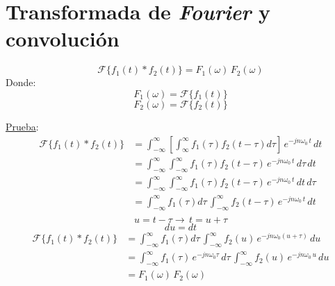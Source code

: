 \section{Transformada de \emph{Fourier} y convolución}
\begin{equation}
    \mathcal{F}\{f_1(t)*f_2(t)\}=F_1(\omega)\,F_2(\omega)
\end{equation}
Donde:
\begin{equation*}
    F_1(\omega)=\mathcal{F}\{f_1(t)\}
\end{equation*}
\begin{equation*}
    F_2(\omega)=\mathcal{F}\{f_2(t)\}
\end{equation*}

\underline{Prueba}:
\begin{equation*}
\begin{split}
    \mathcal{F}\{f_1(t)*f_2(t)\}
        &=\int_{-\infty}^{\infty}\left[
            \int_{\infty}^{\infty}f_1(\tau)f_2(t-\tau)d\tau
        \right]\,e^{-jn\omega_0\,t}\,dt\\
        &=\int_{-\infty}^{\infty}\int_{-\infty}^{\infty}
            f_1(\tau)f_2(t-\tau)\,e^{-jn\omega_0\,t}\,d\tau\,dt\\
        &=\int_{-\infty}^{\infty}\int_{-\infty}^{\infty}
            f_1(\tau)f_2(t-\tau)\,e^{-jn\omega_0\,t}\,dt\,d\tau\\
        &=\int_{-\infty}^{\infty}f_1(\tau)d\tau\,\int_{-\infty}^{\infty}
            f_2(t-\tau)\,e^{-jn\omega_0\,t}\,dt\\
\end{split}
\end{equation*}
\begin{equation*}
    u=t-\tau\rightarrow\,t=u+\tau
\end{equation*}
\begin{equation*}
    du=dt
\end{equation*}
\begin{equation*}
\begin{split}
    \mathcal{F}\{f_1(t)*f_2(t)\}
        &=\int_{-\infty}^{\infty}f_1(\tau)d\tau\,\int_{-\infty}^{\infty}
            f_2(u)\,e^{-jn\omega_0(u+\tau)}\,du\\
        &=\int_{-\infty}^{\infty}f_1(\tau)\,e^{-jn\omega_0\tau}\,d\tau\,
            \int_{-\infty}^{\infty}f_2(u)\,e^{-jn\omega_0\,u}\,du\\
        &=F_1(\omega)\,F_2(\omega)\\
\end{split}
\end{equation*}

